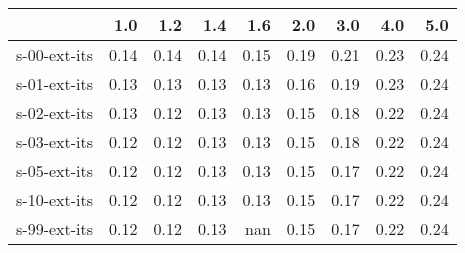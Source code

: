 \begin{tabular}{lrrrrrrrr}
\toprule
{} &  1.0 &  1.2 &  1.4 &  1.6 &  2.0 &  3.0 &  4.0 &  5.0 \\
\midrule
s-00-ext-its & 0.14 & 0.14 & 0.14 & 0.15 & 0.19 & 0.21 & 0.23 & 0.24 \\
s-01-ext-its & 0.13 & 0.13 & 0.13 & 0.13 & 0.16 & 0.19 & 0.23 & 0.24 \\
s-02-ext-its & 0.13 & 0.12 & 0.13 & 0.13 & 0.15 & 0.18 & 0.22 & 0.24 \\
s-03-ext-its & 0.12 & 0.12 & 0.13 & 0.13 & 0.15 & 0.18 & 0.22 & 0.24 \\
s-05-ext-its & 0.12 & 0.12 & 0.13 & 0.13 & 0.15 & 0.17 & 0.22 & 0.24 \\
s-10-ext-its & 0.12 & 0.12 & 0.13 & 0.13 & 0.15 & 0.17 & 0.22 & 0.24 \\
s-99-ext-its & 0.12 & 0.12 & 0.13 &  nan & 0.15 & 0.17 & 0.22 & 0.24 \\
\bottomrule
\end{tabular}
